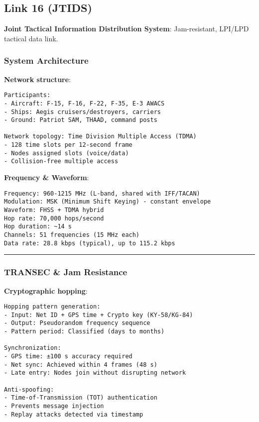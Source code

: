 \subsection{\texorpdfstring{ Link 16
(JTIDS)}{ Link 16 (JTIDS)}}\label{link-16-jtids}

\textbf{Joint Tactical Information Distribution System}: Jam-resistant,
LPI/LPD tactical data link.

\subsubsection{System Architecture}\label{system-architecture}

\textbf{Network structure}:

\begin{verbatim}
Participants:
- Aircraft: F-15, F-16, F-22, F-35, E-3 AWACS
- Ships: Aegis cruisers/destroyers, carriers
- Ground: Patriot SAM, THAAD, command posts

Network topology: Time Division Multiple Access (TDMA)
- 128 time slots per 12-second frame
- Nodes assigned slots (voice/data)
- Collision-free multiple access
\end{verbatim}

\textbf{Frequency \& Waveform}:

\begin{verbatim}
Frequency: 960-1215 MHz (L-band, shared with IFF/TACAN)
Modulation: MSK (Minimum Shift Keying) - constant envelope
Waveform: FHSS + TDMA hybrid
Hop rate: 70,000 hops/second
Hop duration: ~14 s
Channels: 51 frequencies (15 MHz each)
Data rate: 28.8 kbps (typical), up to 115.2 kbps
\end{verbatim}

\begin{center}\rule{0.5\linewidth}{0.5pt}\end{center}

\subsubsection{TRANSEC \& Jam Resistance}\label{transec-jam-resistance}

\textbf{Cryptographic hopping}:

\begin{verbatim}
Hopping pattern generation:
- Input: Net ID + GPS time + Crypto key (KY-58/KG-84)
- Output: Pseudorandom frequency sequence
- Pattern period: Classified (days to months)

Synchronization:
- GPS time: ±100 s accuracy required
- Net sync: Achieved within 4 frames (48 s)
- Late entry: Nodes join without disrupting network

Anti-spoofing:
- Time-of-Transmission (TOT) authentication
- Prevents message injection
- Replay attacks detected via timestamp
\end{verbatim}

